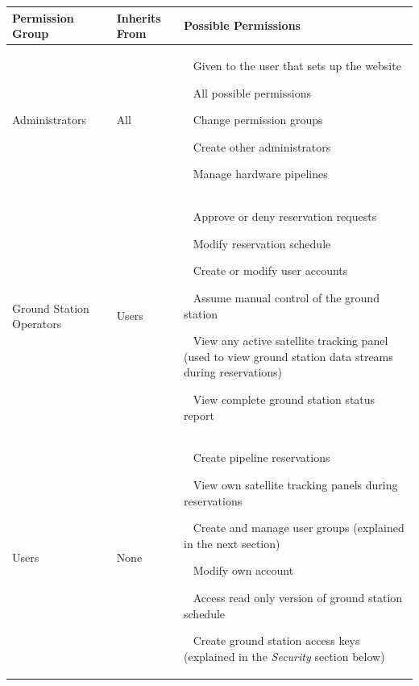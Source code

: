 \documentclass{mxl-design}
\begin{document}
\begin{table}[H]
\begin{center}
{\renewcommand{\arraystretch}{1.5}
\begin{tabular}{p{2in}|p{1in}|p{3in}}
	\bf Permission Group & \bf Inherits From & \bf Possible Permissions \\ 
	\hline
		Administrators 
	&
		All
	&
		\textbullet~ Given to the user that sets up the website \par
		\textbullet~ All possible permissions \par
		\textbullet~ Change permission groups \par
		\textbullet~ Create other administrators \par
		\textbullet~ Manage hardware pipelines
	\\ \hline
		Ground Station Operators
	&
		Users
	&
		\textbullet~ Approve or deny reservation requests \par
		\textbullet~ Modify reservation schedule \par
		\textbullet~ Create or modify user accounts \par
		\textbullet~ Assume manual control of the ground station \par
		\textbullet~ View any active satellite tracking panel (used to view ground station data streams during reservations) \par
		\textbullet~ View complete ground station status report
	\\ \hline
		Users
	&
		None
	&
		\textbullet~ Create pipeline reservations \par
		\textbullet~ View own satellite tracking panels during reservations \par
		\textbullet~ Create and manage user groups (explained in the next section) \par
		\textbullet~ Modify own account \par
		\textbullet~ Access read only version of ground station schedule \par
		\textbullet~ Create ground station access keys (explained in the \textit{Security} section below)
	\\
\end{tabular}}
\end{center}
\end{table}
\end{document}

